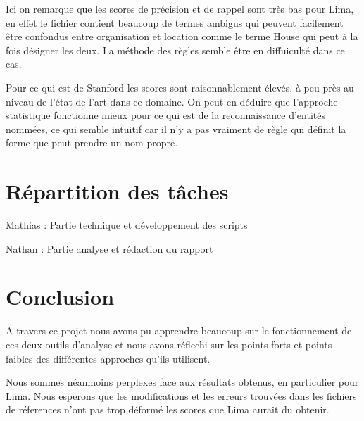 \documentclass[12pt]{report}
\begin{document}
Ici on remarque que les scores de précision et de rappel sont très bas pour Lima, en effet le fichier contient beaucoup de termes ambigus qui peuvent facilement être confondus entre organisation et location comme le terme House qui peut à la fois désigner les deux. La méthode des règles semble être en diffuiculté dans ce cas.

Pour ce qui est de Stanford les scores sont raisonnablement élevés, à peu près au niveau de l'état de l'art dans ce domaine. On peut en déduire que l'approche statistique fonctionne mieux pour ce qui est de la reconnaissance d'entités nommées, ce qui semble intuitif car il n'y a pas vraiment de règle qui définit la forme que peut prendre un nom propre.

\newpage
\section{Répartition des tâches}

Mathias : Partie technique et développement des scripts

Nathan :  Partie analyse et rédaction du rapport


\newpage
\section{Conclusion}

A travers ce projet nous avons pu apprendre beaucoup sur le fonctionnement de ces deux outils d'analyse et nous avons réflechi sur les points forts et points faibles des différentes approches qu'ils utilisent.

Nous sommes néanmoins perplexes face aux résultats obtenus, en particulier pour Lima. Nous esperons que les modifications et les erreurs trouvées dans les fichiers de réferences n'ont pas trop déformé les scores que Lima aurait du obtenir.

 
\end{document}
